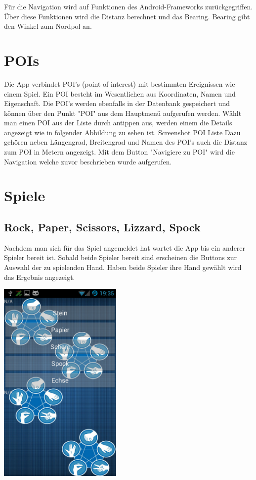Für die Navigation wird auf Funktionen des Android-Frameworks zurückgegriffen. Über diese Funktionen wird die Distanz berechnet und das Bearing. Bearing gibt den Winkel zum Nordpol an.

\section{POIs}
Die App verbindet POI's (point of interest)  mit bestimmten Ereignissen wie einem Spiel. Ein POI besteht im Wesentlichen aus Koordinaten, Namen und Eigenschaft.  Die POI's werden ebenfalls in der Datenbank gespeichert und können über den Punkt "POI" aus dem Hauptmenü aufgerufen werden. Wählt man einen POI aus der Liste durch antippen aus, werden einem die Details angezeigt wie in folgender Abbildung zu sehen ist.
\TODO Screenshot POI Liste
Dazu gehören neben Längengrad, Breitengrad und Namen des POI's auch die Distanz zum POI in Metern angezeigt. Mit dem Button "Navigiere zu POI" wird die Navigation welche zuvor beschrieben wurde aufgerufen.

\section{Spiele}


\subsection{Rock, Paper, Scissors, Lizzard, Spock}
Nachdem man sich für das Spiel angemeldet hat wartet die App bis ein anderer Spieler bereit ist. Sobald beide Spieler bereit sind erscheinen die Buttons zur Auswahl der zu spielenden Hand. Haben beide Spieler ihre Hand gewählt wird das Ergebnis angezeigt.

\begin{capfigure}
	\includegraphics[width=6cm]{images/app/rpssl}
\end{capfigure}

